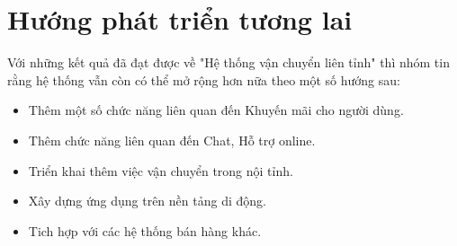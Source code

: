 	
	
	\section{Hướng phát triển tương lai}
	Với những kết quả đã đạt được về "Hệ thống vận chuyển liên tỉnh" thì nhóm tin rằng hệ thống vẫn còn có thể mở rộng hơn nữa theo một số hướng sau:
	
	\begin{itemize}
		\item Thêm một số chức năng liên quan đến Khuyến mãi cho người dùng.
		\item Thêm chức năng liên quan đến Chat, Hỗ trợ online.
		\item Triển khai thêm việc vận chuyển trong nội tỉnh.
		\item Xây dựng ứng dụng trên nền tảng di động.
		\item Tich hợp với các hệ thống bán hàng khác. 
	\end{itemize}
